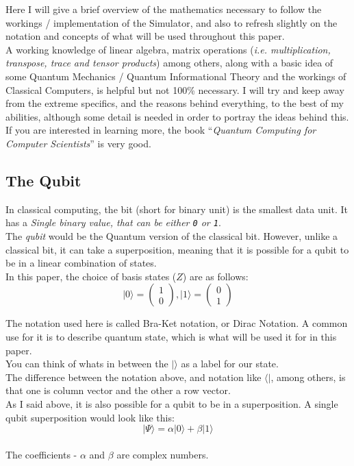 \documentclass[../main.tex]{subfiles}
\begin{document}
Here I will give a brief overview of the mathematics necessary to follow
the workings / implementation of the Simulator, and also to refresh
slightly on the notation and concepts of what will be used throughout
this paper.\\
A working knowledge of linear algebra, matrix operations (\emph{i.e.
multiplication, transpose, trace and tensor products}) among others,
along with a basic idea of some Quantum Mechanics / Quantum
Informational Theory and the workings of Classical Computers, is helpful
but not 100\% necessary. I will try and keep away from the extreme
specifics, and the reasons behind everything, to the best of my
abilities, although some detail is needed in order to portray the ideas
behind this. If you are interested in learning more, the book
``\emph{Quantum Computing for Computer Scientists}'' \cite{quantumcomputerscience} is very good.

\subsection{The Qubit}

In classical computing, the bit (short for binary unit) is the smallest
data unit. It has a \emph{Single binary value, that can be either
\texttt{0} or \texttt{1}}.\\
The \emph{qubit} would be the Quantum version of the classical bit.
However, unlike a classical bit, it can take a superposition, meaning
that it is possible for a qubit to be in a linear combination of
states.\\
In this paper, the choice of basis states (\(Z\)) are as follows:
\begin{equation}
	\lvert0\rangle =\left( \begin{matrix} 1\\ 0 \end{matrix} \right), \lvert1\rangle =\left( \begin{matrix} 0\\ 1\end{matrix} \right)
\end{equation}

The notation used here is called Bra-Ket notation, or Dirac Notation. A
common use for it is to describe quantum state, which is what will be
used it for in this paper.\\
You can think of whats in between the \(\lvert\rangle\) as a label for our
state.\\
The difference between the notation above, and notation like
\(\langle\lvert\), among others, is that one is column vector and the other a
row vector.\\
As I said above, it is also possible for a qubit to be in a
superposition. A single qubit superposition would look like this:\\
\[
\left\lvert \Psi \rangle =\alpha\lvert0\rangle +\beta\right\lvert 1\rangle\]\\
The coefficients - \(\alpha\) and \(\beta\) are complex numbers.
\end{document}
